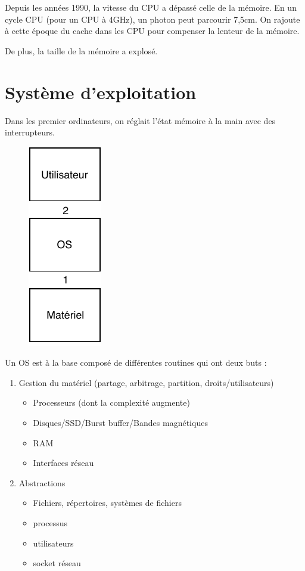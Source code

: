 \documentclass[11pt]{article}
\begin{document}
Depuis les années 1990, la vitesse du CPU a dépassé celle de la mémoire. En un cycle CPU (pour un CPU à 4GHz), un photon peut parcourir 7,5cm. On rajoute à cette époque du cache dans les CPU pour compenser la lenteur de la mémoire.

De plus, la taille de la mémoire a explosé.

\section{Système d'exploitation}
Dans les premier ordinateurs, on réglait l'état mémoire à la main avec des interrupteurs.

\begin{figure}
    \centering
    \includegraphics{img/hw-os-user.pdf}
\end{figure}

Un OS est à la base composé de différentes routines qui ont deux buts :
\begin{enumerate}
    \item Gestion du matériel (partage, arbitrage, partition, droits/utilisateurs) \begin{itemize}
        \item Processeurs (dont la complexité augmente)
        \item Disques/SSD/Burst buffer/Bandes magnétiques
        \item RAM
        \item Interfaces réseau
    \end{itemize}
    \item Abstractions
    \begin{itemize}
        \item Fichiers, répertoires, systèmes de fichiers
        \item processus
        \item utilisateurs
        \item socket réseau
    \end{itemize}
\end{enumerate}
\end{document}
